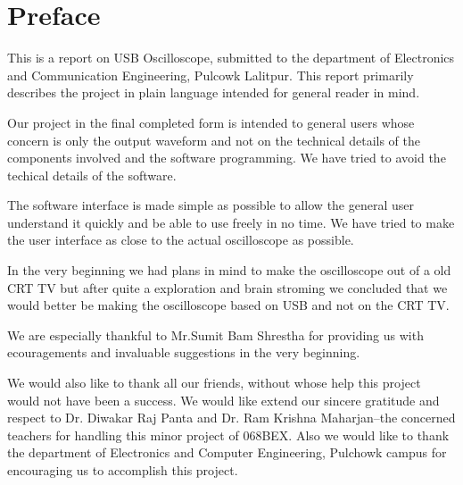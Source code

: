 \section*{Preface}
This is a report on USB Oscilloscope, submitted to the department of Electronics and Communication Engineering, Pulcowk Lalitpur. This report primarily describes the project in plain language intended for general reader in mind. 


Our project in the final completed form is intended to general users whose concern is only the output waveform and not on the technical details of the components involved and the software programming. We have tried to avoid the techical details of the software.


The software interface is made simple as possible to allow the general user understand it quickly and be able to use freely in no time. We have tried to make the user interface as close to the actual oscilloscope as possible.


In the very beginning we had plans in mind to make the oscilloscope out of a old CRT TV but after quite a exploration and brain stroming we concluded that we would better be making the oscilloscope based on USB and not on the CRT TV. 


We are especially thankful to Mr.Sumit Bam Shrestha for providing us with ecouragements and invaluable suggestions in the very beginning.


We would also like to thank all our friends, without whose help this project would not have been a success. We would like extend our sincere gratitude and respect to Dr. Diwakar Raj Panta and Dr. Ram Krishna Maharjan--the concerned teachers for handling this minor project of 068BEX. Also we would like to thank the department of Electronics and Computer Engineering, Pulchowk campus for encouraging us to accomplish this project.